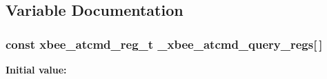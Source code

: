 \subsection{Variable Documentation}
\hypertarget{group__xbee__atcmd_ga0b78107b2303165b7cf9969125064dcc}{
\subsubsection[{\-\_\-xbee\-\_\-atcmd\-\_\-query\-\_\-regs}]{\setlength{\rightskip}{0pt plus 5cm}const {\bf xbee\-\_\-atcmd\-\_\-reg\-\_\-t} \-\_\-xbee\-\_\-atcmd\-\_\-query\-\_\-regs\mbox{[}$\,$\mbox{]}}}\label{group__xbee__atcmd_ga0b78107b2303165b7cf9969125064dcc}
{\bfseries Initial value\-:}
